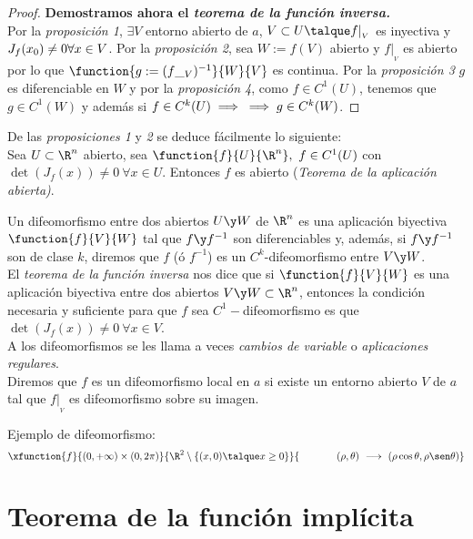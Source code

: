 \begin{proof}
	\textbf{Demostramos ahora el \textit{teorema de la función inversa.}}\\
	Por la \textit{proposición 1}, $\exists	V$ entorno abierto de $a$, $V\subset U\talque f|_{_V}$ es inyectiva y $J_f(x_0)\neq 0\\\forall x\in V$. Por la \textit{proposición 2}, sea $W:=f(V)$ abierto y $f|_{_V}$ es abierto por lo que $\function{g:=(f\_{_V})^{-1}}{W}{V}$ es continua. Por la \textit{proposición 3} $g$ es diferenciable en $W$ y por la \textit{proposición 4}, como $f\in C^1(U)$, tenemos que $g\in C^1(W)$ y además si $f\in C^k(U)\implies\\\implies g\in C^k(W)$.
	\end{proof}
	
	\begin{observacion} De las \textit{proposiciones 1} y \textit{2} se deduce fácilmente lo siguiente:\\
	Sea $U\subset \R^n$ abierto, sea $\function{f}{U}{\R^n},\ f\in C^1(U)$ con $\det(J_f(x))\neq 0\ \forall x\in U$. Entonces $f$ es abierto (\textit{Teorema de la aplicación abierta)}.
	\end{observacion}
	
	\begin{defi} Un difeomorfismo entre dos abiertos $U\y W$ de $\R^n$ es una aplicación biyectiva $\function{f}{V}{W}$ tal que $f\y f^{-1}$ son diferenciables y, además, si $f\y f^{-1}$ son de clase $k$, diremos que $f$ (ó $f^{-1}$) es un $C^k$-difeomorfismo entre $V\y W$.\\
	El \textit{teorema de la función inversa} nos dice que si $\function{f}{V}{W}$ es una aplicación biyectiva entre dos abiertos $V\y W\subset\R^n$, entonces la condición necesaria y suficiente para que $f$ sea $C^1-$difeomorfismo es que $\det(J_f(x))\neq0\ \forall x\in V$.\\
	A los difeomorfismos se les llama a veces \textit{cambios de variable} o \textit{aplicaciones regulares}.\\
	Diremos que $f$ es un difeomorfismo local en $a$ si existe un entorno abierto $V$ de $a$ tal que $f|_{_V}$ es difeomorfismo sobre su imagen.
	\begin{ejem} Ejemplo de difeomorfismo:
	\[\xfunction{f}{(0,+\infty)\times(0,2\pi)}{\R^2\setminus\{(x,0)\talque x\geq0\}}{\ \ \ \ \ \ \ \ \ \ \ (\rho,\theta)\ \longrightarrow\ (\rho\cos\theta,\rho\sen\theta)}\]
	\end{ejem}
	\end{defi}
	
	\section{Teorema de la función implícita}
	
